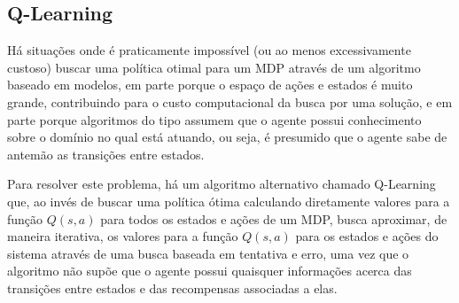 \documentclass[cic,tc]{iiufrgs}
\begin{document}
%
%
%
%
%
%
%
%
%
%


\subsection{Q-Learning}
Há situações onde é praticamente impossível (ou ao menos excessivamente custoso)
buscar uma política otimal para um MDP através de um algoritmo baseado em modelos,
em parte porque o espaço de ações e estados é
muito grande, contribuindo para o custo computacional da busca por uma solução,
e em parte porque algoritmos do tipo
assumem que o agente possui conhecimento sobre o domínio no qual está atuando,
ou seja, é presumido que o agente sabe de antemão as transições entre estados.

Para resolver este problema, há um algoritmo alternativo chamado Q-Learning
\cite{Wattkins1989} que,
ao invés de buscar uma política ótima calculando diretamente valores para a
função $Q(s, a)$ para todos os estados e ações de um MDP, busca aproximar, de
maneira iterativa, os valores para a função $Q(s, a)$ para os estados e ações do
sistema através de uma busca baseada em tentativa e erro, uma vez que o algoritmo
não supõe que o agente possui quaisquer informações acerca das transições entre
estados e das recompensas associadas a elas.
\end{document}
